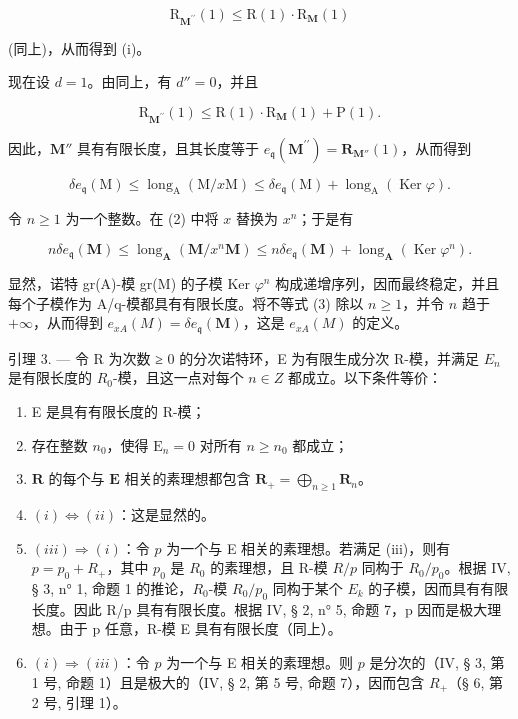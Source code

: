 \[
\mathrm{R} _ {\mathbf {M} ^ {\prime \prime}} (1) \leqslant \mathrm{R} (1)\cdot \mathrm{R} _ {\mathbf {M}} (1)
\]

(同上)，从而得到 (i)。

现在设 \(d=1\)。由同上，有 \(d''=0\)，并且

\[
\mathrm{R} _ {\mathbf {M} ^ {\prime \prime}} (1) \leqslant \mathrm{R} (1)\cdot \mathrm{R} _ {\mathbf {M}} (1) + \mathrm{P} (1).
\]

因此，\(\mathbf{M}''\) 具有有限长度，且其长度等于 \(e_{\mathfrak{q}}(\mathbf{M}^{\prime \prime}) = \mathbf{R}_{\mathbf{M}''}(1)\)，从而得到

\[
\delta e _ {\mathfrak {q}} (\mathrm{M}) \leqslant \operatorname{long} _ {\mathrm{A}} (\mathrm{M} / x \mathrm{M}) \leqslant \delta e _ {\mathfrak {q}} (\mathrm{M}) + \operatorname{long} _ {\mathrm{A}} (\operatorname{Ker} \varphi).\tag{2}
\]

令 \(n \geqslant 1\) 为一个整数。在 (2) 中将 \(x\) 替换为 \(x^n\)；于是有

\[
n \delta e _ {\mathfrak{q}} (\mathbf {M}) \leqslant \operatorname{long} _ {\mathbf {A}} (\mathbf {M} / x ^ {n} \mathbf {M}) \leqslant n \delta e _ {\mathfrak{q}} (\mathbf {M}) + \operatorname{long} _ {\mathbf {A}} (\operatorname{Ker} \varphi^ {n}).\tag{3}
\]

显然，诺特 gr(A)-模 gr(M) 的子模 Ker \(\varphi^{n}\) 构成递增序列，因而最终稳定，并且每个子模作为 A/q-模都具有有限长度。将不等式 (3) 除以 \(n \geqslant 1\)，并令 \(n\) 趋于 \(+\infty\)，从而得到 \(e_{xA}(M) = \delta e_{\mathfrak{q}}(\mathbf{M})\)，这是 \(e_{xA}(M)\) 的定义。

引理 3. — 令 R 为次数 ≥ 0 的分次诺特环，E 为有限生成分次 R-模，并满足 \(E_{n}\) 是有限长度的 \(R_{0}\)-模，且这一点对每个 \(n \in Z\) 都成立。以下条件等价：

\begin{enumerate}
\def\labelenumi{(\roman{enumi})}
\item
  E 是具有有限长度的 R-模；
\item
   存在整数 \(n_0\)，使得 \(\mathrm{E}_n = 0\) 对所有 \(n \geqslant n_0\) 都成立；
\item
  \(\mathbf{R}\) 的每个与 \(\mathbf{E}\) 相关的素理想都包含 \(\mathbf{R}_{+} = \bigoplus_{n\geqslant 1}\mathbf{R}_{n}\)。
\item
  \((i) \Leftrightarrow (ii)\)：这是显然的。
\item
  \((iii) \Rightarrow (i)\)：令 \(p\) 为一个与 E 相关的素理想。若满足 (iii)，则有 \(p = p_0 + R_+\)，其中 \(p_0\) 是 \(R_0\) 的素理想，且 R-模 \(R/p\) 同构于 \(R_0/p_0\)。根据 IV, § 3, n° 1, 命题 1 的推论，\(R_0\)-模 \(R_0/p_0\) 同构于某个 \(E_k\) 的子模，因而具有有限长度。因此 R/p 具有有限长度。根据 IV, § 2, n° 5, 命题 7，p 因而是极大理想。由于 p 任意，R-模 E 具有有限长度（同上）。
\item
  \((i) \Rightarrow (iii)\)：令 \(p\) 为一个与 E 相关的素理想。则 \(p\) 是分次的（IV, § 3, 第 1 号, 命题 1）且是极大的（IV, § 2, 第 5 号, 命题 7），因而包含 \(R_{+}\)（§ 6, 第 2 号, 引理 1）。
\end{enumerate}

